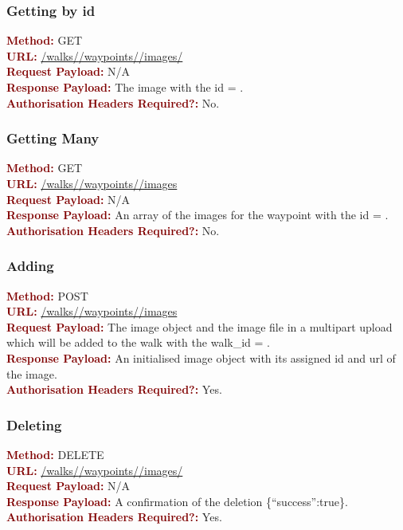 \documentclass[11pt,a4paper]{report}
\begin{document}
\subsubsection{Getting by id}
\textbf{\textcolor{Maroon}{Method:}} GET\\
\textbf{\textcolor{Maroon}{URL:}} \url{/walks/}\url{/waypoints/}\url{/images/}\\
\textbf{\textcolor{Maroon}{Request Payload:}} N/A\\
\textbf{\textcolor{Maroon}{Response Payload:}} The image with the id = .\\
\textbf{\textcolor{Maroon}{Authorisation Headers Required?:}} No.

\subsubsection{Getting Many}
\textbf{\textcolor{Maroon}{Method:}} GET\\
\textbf{\textcolor{Maroon}{URL:}} \url{/walks/}\url{/waypoints/}\url{/images}\\
\textbf{\textcolor{Maroon}{Request Payload:}} N/A\\
\textbf{\textcolor{Maroon}{Response Payload:}} An array of the images for the waypoint with the id = .\\
\textbf{\textcolor{Maroon}{Authorisation Headers Required?:}} No.

\subsubsection{Adding}
\textbf{\textcolor{Maroon}{Method:}} POST\\
\textbf{\textcolor{Maroon}{URL:}} \url{/walks/}\url{/waypoints/}\url{/images}\\
\textbf{\textcolor{Maroon}{Request Payload:}} The image object and the image file in a multipart upload which will be added to the walk with the walk\_id = .\\
\textbf{\textcolor{Maroon}{Response Payload:}} An initialised image object with its assigned id and url of the image.\\
\textbf{\textcolor{Maroon}{Authorisation Headers Required?:}} Yes.

\subsubsection{Deleting}
\textbf{\textcolor{Maroon}{Method:}} DELETE\\
\textbf{\textcolor{Maroon}{URL:}} \url{/walks/}\url{/waypoints/}\url{/images/}\\
\textbf{\textcolor{Maroon}{Request Payload:}} N/A\\
\textbf{\textcolor{Maroon}{Response Payload:}} A confirmation of the deletion \{``success'':true\}.\\
\textbf{\textcolor{Maroon}{Authorisation Headers Required?:}} Yes.
\end{document}
